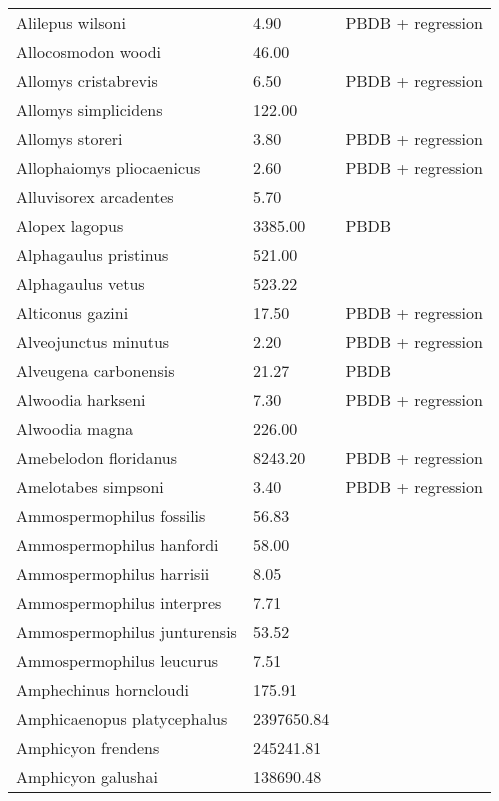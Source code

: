 \begin{longtable}{p{} p{} p{}}
    Alilepus wilsoni & 4.90 & PBDB + regression \\ 
    Allocosmodon woodi & 46.00 & \cite{Wilson2012} \\ 
    Allomys cristabrevis & 6.50 & PBDB + regression \\ 
    Allomys simplicidens & 122.00 & \cite{McKenna2011} \\ 
    Allomys storeri & 3.80 & PBDB + regression \\ 
    Allophaiomys pliocaenicus & 2.60 & PBDB + regression \\ 
    Alluvisorex arcadentes & 5.70 & \cite{Tomiya2013} \\ 
    Alopex lagopus & 3385.00 & PBDB \\ 
    Alphagaulus pristinus & 521.00 & \cite{McKenna2011} \\ 
    Alphagaulus vetus & 523.22 & \cite{Tomiya2013} \\ 
    Alticonus gazini & 17.50 & PBDB + regression \\ 
    Alveojunctus minutus & 2.20 & PBDB + regression \\ 
    Alveugena carbonensis & 21.27 & PBDB \\ 
    Alwoodia harkseni & 7.30 & PBDB + regression \\ 
    Alwoodia magna & 226.00 & \cite{McKenna2011} \\ 
    Amebelodon floridanus & 8243.20 & PBDB + regression \\ 
    Amelotabes simpsoni & 3.40 & PBDB + regression \\ 
    Ammospermophilus fossilis & 56.83 & \cite{Tomiya2013} \\ 
    Ammospermophilus hanfordi & 58.00 & \cite{McKenna2011} \\ 
    Ammospermophilus harrisii & 8.05 & \cite{Smith2004} \\ 
    Ammospermophilus interpres & 7.71 & \cite{Smith2004} \\ 
    Ammospermophilus junturensis & 53.52 & \cite{Tomiya2013} \\ 
    Ammospermophilus leucurus & 7.51 & \cite{Smith2004} \\ 
    Amphechinus horncloudi & 175.91 & \cite{Tomiya2013} \\ 
    Amphicaenopus platycephalus & 2397650.84 & \cite{Tomiya2013} \\ 
    Amphicyon frendens & 245241.81 & \cite{Tomiya2013} \\ 
    Amphicyon galushai & 138690.48 & \cite{Tomiya2013} \\ 

\end{longtable}
